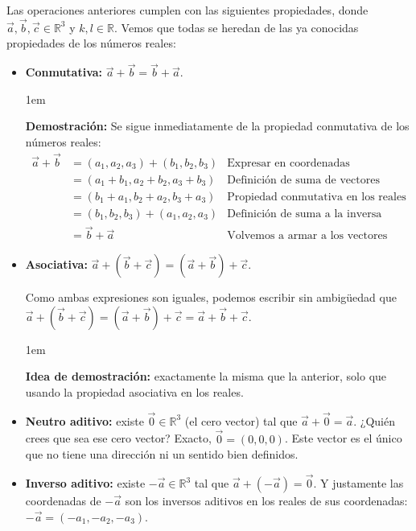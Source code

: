 \documentclass[12pt, fleqn]{report}                             %
\newenvironment{SmallIndentation}[1][0.75em]                    %
    {\begin{adjustwidth}{#1}{}\begin{footnotesize}}                 %
    {\end{footnotesize}\end{adjustwidth}}                           %
\newcommand{\ve}[1]{\vec{#1}}									%
\begin{document}
			Las operaciones anteriores cumplen con las siguientes propiedades, donde $\ve{a},\ve{b}, \ve{c} \in \mathbb{R}^3$ y $k,l \in \mathbb{R}$. Vemos que todas se heredan de las ya conocidas propiedades de los números reales:
			\begin{itemize}\setlength\itemsep{0em}
				\item \textbf{Conmutativa:} $\ve{a}+\ve{b} = \ve{b}+\ve{a}$.
				
				\begin{SmallIndentation}[1em]
					\textbf{Demostración:}
					Se sigue inmediatamente de la propiedad conmutativa de los números reales:
					\begin{align*}
						\ve{a}+\ve{b} &= (a_1, a_2, a_3) + (b_1, b_2, b_3) &\mbox{Expresar en coordenadas}\\
						&= (a_1 + b_1, a_2 + b_2, a_3 + b_3) &\mbox{Definición de suma de vectores}\\
						&= (b_1 + a_1, b_2 + a_2, b_3 + a_3) &\mbox{Propiedad conmutativa en los reales}\\
						&= (b_1, b_2, b_3) + (a_1, a_2, a_3) &\mbox{Definición de suma a la inversa}\\
						&= \ve{b} + \ve{a} &\mbox{Volvemos a armar a los vectores}
					\end{align*}
				\end{SmallIndentation}
				
				\item \textbf{Asociativa:} $\ve{a}+\left(\ve{b}+\ve{c}\right) = \left(\ve{a}+\ve{b}\right)+\ve{c}$.
				
				Como ambas expresiones son iguales, podemos escribir sin ambigüedad que $\ve{a}+\left(\ve{b}+\ve{c}\right) = \left(\ve{a}+\ve{b}\right)+\ve{c} = \ve{a}+\ve{b}+\ve{c}$.
				
				\begin{SmallIndentation}[1em]
					\textbf{Idea de demostración:} exactamente la misma que la anterior, solo que usando la propiedad asociativa en los reales.
				\end{SmallIndentation}
				
				\item \textbf{Neutro aditivo:} existe $\ve{0} \in \mathbb{R}^3$ (el cero vector) tal que $\ve{a}+\ve{0}=\ve{a}$. ¿Quién crees que sea ese cero vector? Exacto, $\ve{0}=(0,0,0)$. Este vector es el único que no tiene una dirección ni un sentido bien definidos.
				
				\item \textbf{Inverso aditivo:} existe $-\ve{a} \in \mathbb{R}^3$ tal que $\ve{a}+\left(-\ve{a}\right)=\ve{0}$. Y justamente las coordenadas de $-\ve{a}$ son los inversos aditivos en los reales de sus coordenadas: $-\ve{a}=(-a_1, -a_2, -a_3)$.
				

\end{itemize}
\end{document}
